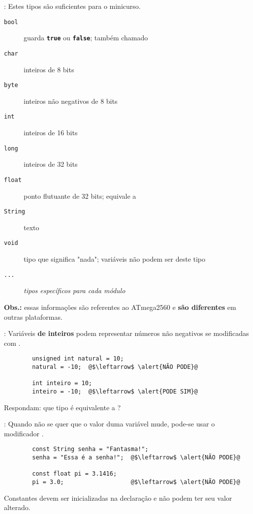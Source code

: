 \begin{frame}{\insertsection: \insertsubsection}
	Estes tipos são suficientes para o minicurso.

	\begin{description}
		\item[\texttt{bool}] guarda \textbf{\texttt{true}} ou \textbf{\texttt{false}}; também chamado \texttt{}
		\item[\texttt{char}] inteiros de 8 bits
		\item[\texttt{byte}] inteiros não negativos de 8 bits
		\item[\texttt{int}] inteiros de 16 bits
		\item[\texttt{long}] inteiros de 32 bits
		\item[\texttt{float}] ponto flutuante de 32 bits; equivale a \texttt{}
		\item[\texttt{String}] texto
		\item[\texttt{void}] tipo que significa "nada"; variáveis não podem ser deste tipo
		\item[\texttt{...}] \textit{tipos específicos para cada módulo}
	\end{description}

	\vfill
	\textbf{Obs.:} essas informações são referentes ao ATmega2560 e \textbf{são diferentes} em outras plataformas.
\end{frame}


\begin{frame}[fragile]{\insertsection: \insertsubsection}
	Variáveis \textbf{de inteiros} podem representar números não negativos se modificadas com \texttt{}.
	\begin{verbatim}
		unsigned int natural = 10;
		natural = -10;  @$\leftarrow$ \alert{NÃO PODE}@

		int inteiro = 10;
		inteiro = -10;  @$\leftarrow$ \alert{PODE SIM}@
	\end{verbatim}

	\pause
	\bigskip
	Respondam: que tipo é equivalente a \texttt{}?\\
	\only<0|handout:2>{R: \texttt{\HighlightSpecial{byte}}}
\end{frame}


\begin{frame}[fragile]{\insertsection: \insertsubsection}
	Quando não se quer que o valor duma variável mude, pode-se usar o modificador \texttt{}.
	\begin{verbatim}
		const String senha = "Fantasma!";
		senha = "Essa é a senha!";  @$\leftarrow$ \alert{NÃO PODE}@

		const float pi = 3.1416;
		pi = 3.0;                   @$\leftarrow$ \alert{NÃO PODE}@
	\end{verbatim}

	Constantes devem ser inicializadas na declaração e não podem ter seu valor alterado.
\end{frame}


